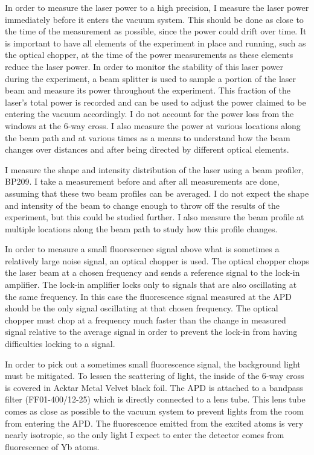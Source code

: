 \documentclass[12pt, a4paper]{article}
\begin{document}
In order to measure the laser power to a high precision, I measure the laser power immediately before it enters the vacuum system. This should be done as close to the time of the measurement as possible, since the power could drift over time. It is important to have all elements of the experiment in place and running, such as the optical chopper, at the time of the power measurements as these elements reduce the laser power. In order to monitor the stability of this laser power during the experiment, a beam splitter is used to sample a portion of the laser beam and measure its power throughout the experiment. This fraction of the laser's total power is recorded and can be used to adjust the power claimed to be entering the vacuum accordingly. I do not account for the power loss from the windows at the 6-way cross. I also measure the power at various locations along the beam path and at various times as a means to understand how the beam changes over distances and after being directed by different optical elements.

I measure the shape and intensity distribution of the laser using a beam profiler, BP209. I take a measurement before and after all measurements are done, assuming that these two beam profiles can be averaged. I do not expect the shape and intensity of the beam to change enough to throw off the results of the experiment, but this could be studied further. I also measure the beam profile at multiple locations along the beam path to study how this profile changes. 

In order to measure a small fluorescence signal above what is sometimes a relatively large noise signal, an optical chopper is used. The optical chopper chops the laser beam at a chosen frequency and sends a reference signal to the lock-in amplifier. The lock-in amplifier locks only to signals that are also oscillating at the same frequency. In this case the fluorescence signal measured at the APD should be the only signal oscillating at that chosen frequency. The optical chopper must chop at a frequency much faster than the change in measured signal relative to the average signal in order to prevent the lock-in from having difficulties locking to a signal.  

In order to pick out a sometimes small fluorescence signal, the background light must be mitigated. To lessen the scattering of light, the inside of the 6-way cross is covered in Acktar Metal Velvet black foil. The APD is attached to a bandpass filter (FF01-400/12-25) which is directly connected to a lens tube. This lens tube comes as close as possible to the vacuum system to prevent lights from the room from entering the APD. The fluorescence emitted from the excited atoms is very nearly isotropic, so the only light I expect to enter the detector comes from fluorescence of Yb atoms.
\end{document}
